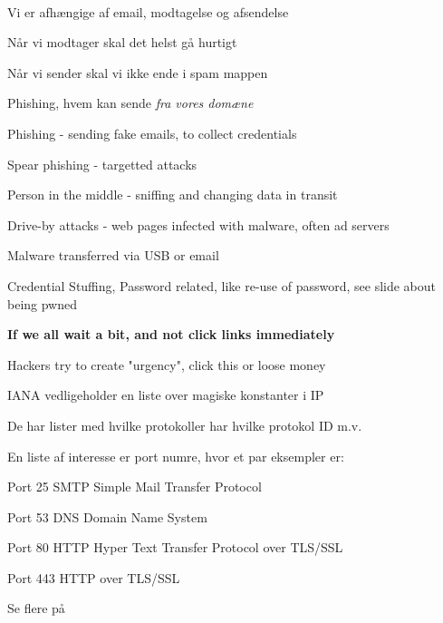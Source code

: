 \documentclass[Screen16to9,17pt]{foils}
\begin{document}

{~}

\begin{list2}
\item Vi er afhængige af email, modtagelse og afsendelse
\item Når vi modtager skal det helst gå hurtigt
\item Når vi sender skal vi ikke ende i spam mappen
\item Phishing, hvem kan sende \emph{fra vores domæne}
\end{list2}



\begin{list2}
\item Phishing - sending fake emails, to collect credentials
\item Spear phishing - targetted attacks
\item Person in the middle - sniffing and changing data in transit
\item Drive-by attacks - web pages infected with malware, often ad servers
\item Malware transferred via USB or email
\item Credential Stuffing, Password related, like re-use of password, see slide about being pwned
\end{list2}

\vskip 1cm
\centerline{\Large\bf If we all wait a bit, and not click links immediately}

\vskip 1cm
Hackers try to create "urgency", click this or loose money






\begin{list1}
\item IANA vedligeholder en liste over magiske konstanter i IP
\item De har lister med hvilke protokoller har hvilke protokol ID m.v.
\item En liste af interesse er port numre, hvor et par eksempler er:
\begin{list2}
\item Port 25 SMTP Simple Mail Transfer Protocol
\item Port 53 DNS Domain Name System
\item Port 80 HTTP Hyper Text Transfer Protocol over TLS/SSL
\item Port 443 HTTP over TLS/SSL
\end{list2}
\item Se flere på 
\end{list1}
\end{document}
